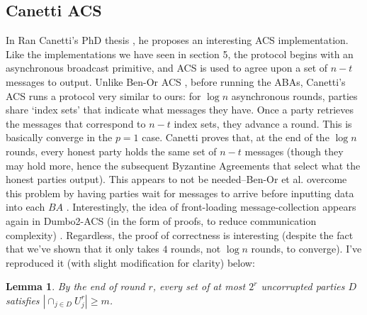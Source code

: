 \documentclass{article}
\newtheorem{lemma}{Lemma}
\begin{document}
\subsection{Canetti ACS}
In Ran Canetti's PhD thesis \cite{canetti1996studies}, he proposes an interesting ACS implementation. Like the implementations we have seen in section 5, the protocol begins with an asynchronous broadcast primitive, and ACS is used to agree upon a set of $n - t$ messages to output. Unlike Ben-Or ACS \cite{ben1994asynchronous}, before running the ABAs, Canetti's ACS runs a protocol very similar to ours: for $\log n$ asynchronous rounds, parties share `index sets' that indicate what messages they have. Once a party retrieves the messages that correspond to $n - t$ index sets, they advance a round. This is basically converge in the $p=1$ case. Canetti proves that, at the end of the $\log n$ rounds, every honest party holds the same set of $n - t$ messages (though they may hold more, hence the subsequent Byzantine Agreements that select what the honest parties output). This appears to not be needed--Ben-Or et al. overcome this problem by having parties wait for messages to arrive before inputting data into each $BA$ \cite{ben1994asynchronous}. Interestingly, the idea of front-loading message-collection appears again in Dumbo2-ACS (in the form of proofs, to reduce communication complexity) \cite{guo2020dumbo}. Regardless, the proof of correctness is interesting (despite the fact that we've shown that it only takes $4$ rounds, not $\log n$ rounds, to converge). I've reproduced it (with slight modification for clarity) below:

\begin{lemma}
By the end of round $r$, every set of at most $2^r$ uncorrupted parties $D$ satisfies $|\cap_{j \in D} U_j^r| \geq m$.
\end{lemma}
\end{document}
